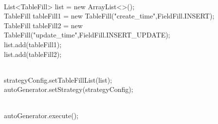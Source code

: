       \\  List<TableFill> list = new ArrayList<>();
      \\  TableFill tableFill1 = new TableFill("create_time",FieldFill.INSERT);
      \\  TableFill tableFill2 = new TableFill("update_time",FieldFill.INSERT_UPDATE);
      \\  list.add(tableFill1);
      \\  list.add(tableFill2);

      \\  strategyConfig.setTableFillList(list);
      \\  autoGenerator.setStrategy(strategyConfig);

      \\  autoGenerator.execute();


